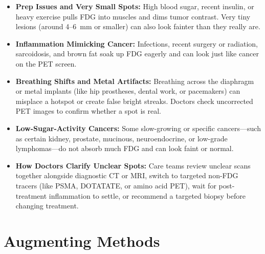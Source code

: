 \begin{itemize}
    \item \textbf{Prep Issues and Very Small Spots:} High blood sugar, recent insulin, or heavy exercise pulls FDG into muscles and dims tumor contrast. Very tiny lesions (around 4--6~mm or smaller) can also look fainter than they really are.
    \item \textbf{Inflammation Mimicking Cancer:} Infections, recent surgery or radiation, sarcoidosis, and brown fat soak up FDG eagerly and can look just like cancer on the PET screen.
    \item \textbf{Breathing Shifts and Metal Artifacts:} Breathing across the diaphragm or metal implants (like hip prostheses, dental work, or pacemakers) can misplace a hotspot or create false bright streaks. Doctors check uncorrected PET images to confirm whether a spot is real.
    \item \textbf{Low-Sugar-Activity Cancers:} Some slow-growing or specific cancers---such as certain kidney, prostate, mucinous, neuroendocrine, or low-grade lymphomas---do not absorb much FDG and can look faint or normal.
    \item \textbf{How Doctors Clarify Unclear Spots:} Care teams review unclear scans together alongside diagnostic CT or MRI, switch to targeted non-FDG tracers (like PSMA, DOTATATE, or amino acid PET), wait for post-treatment inflammation to settle, or recommend a targeted biopsy before changing treatment.
\end{itemize}

\section{Augmenting Methods}

